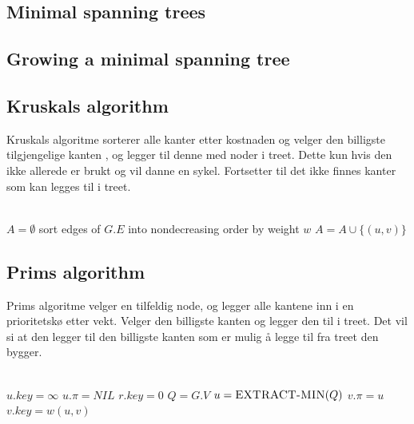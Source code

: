 \documentclass[a4paper, 10pt]{article}
\begin{document}
\begin{algorithmic}
\section{Minimal spanning trees}
\subsection{Growing a minimal spanning tree}
\subsection{Kruskals algorithm}

Kruskals algoritme sorterer alle kanter etter kostnaden og velger den billigste tilgjengelige kanten , og legger til denne med noder i treet. Dette kun hvis den ikke allerede er brukt og vil danne en sykel. Fortsetter til det ikke finnes kanter som kan legges til i treet.  \\ \hfill
\\

\begin{algoritmic}
\State $A = \emptyset$
        \State {}
\EndFor
\State sort edges of $G.E$ into nondecreasing order by weight $w$
                \State $A = A \cup \{ (u,v) \}$
                \State {} 
        \EndIf  
\EndFor
\State {}


\subsection{Prims algorithm}

Prims algoritme velger en tilfeldig node, og legger alle kantene inn i en prioritetskø etter vekt. Velger den billigste kanten og legger den til i treet.  Det vil si at den legger til den billigste kanten som er mulig å legge til fra treet den bygger. \\ \hfill
\\

\begin{algoritmic}
        \State $u.key = \infty$
        \State $u.\pi = NIL$
\EndFor
\State $r.key = 0$
\State $Q = G.V$
        \State $u = \Call{EXTRACT-MIN}{Q}$
                        \State $v.\pi = u$
                        \State $v.key = w(u, v)$
                \EndIf
        \EndFor
\EndWhile
\EndFunction
\end{algoritmic}



\end{algoritmic}
\end{algorithmic}
\end{document}
